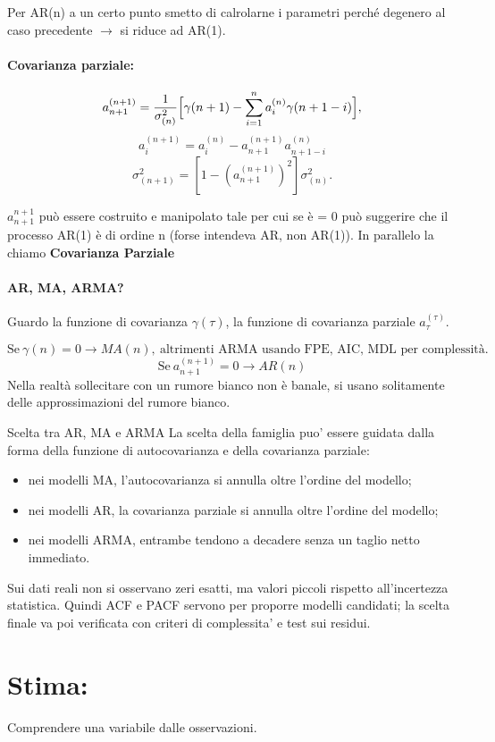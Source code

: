 \documentclass[11pt,a4paper]{article}
\begin{document}
Per AR(n) a un certo punto smetto di calrolarne i parametri perché degenero al caso precedente $\rightarrow$ si riduce ad AR(1). 

\paragraph{Covarianza parziale:}
\[
a_{n+1}^{(n+1)}=\frac{1}{\sigma^2_{(n)}}\Bigl[\gamma(n+1)-\sum_{i=1}^{n}a_i^{(n)}\gamma(n+1-i)\Bigr],
\]
\[
a_i^{(n+1)}=a_i^{(n)}-a_{n+1}^{(n+1)}a_{n+1-i}^{(n)}
\]
\[
\sigma^2_{(n+1)}=[1-(a_{n+1}^{(n+1)})^2]\sigma^2_{(n)}.
\]

$a_{n+1}^{n+1}$ può essere costruito e manipolato tale per cui se è = 0 può suggerire che il processo AR(1) è di ordine n (forse intendeva AR, non AR(1)). In parallelo la chiamo \textbf{Covarianza Parziale}

\paragraph{AR, MA, ARMA?} 
Guardo la funzione di covarianza $\gamma(\tau)$, la funzione di covarianza parziale $a_{\tau}^{(\tau)}$. 

\[
\text{Se} \ \gamma(n) = 0 \rightarrow MA(n), \ \text{altrimenti ARMA usando FPE, AIC, MDL per complessità.}
\]
\[
\text{Se}\  a_{n+1}^{(n+1)}= 0 \rightarrow AR(n)
\]
Nella realtà sollecitare con un rumore bianco non è banale, si usano solitamente delle approssimazioni del rumore bianco.

\begin{spiegazione}{Scelta tra AR, MA e ARMA}
La scelta della famiglia puo' essere guidata dalla forma della funzione di autocovarianza e della covarianza parziale:
\begin{itemize}
  \item nei modelli MA, l'autocovarianza si annulla oltre l'ordine del modello;
  \item nei modelli AR, la covarianza parziale si annulla oltre l'ordine del modello;
  \item nei modelli ARMA, entrambe tendono a decadere senza un taglio netto immediato.
\end{itemize}
Sui dati reali non si osservano zeri esatti, ma valori piccoli rispetto all'incertezza statistica. Quindi ACF e PACF servono per proporre modelli candidati; la scelta finale va poi verificata con criteri di complessita' e test sui residui.
\end{spiegazione}
\section{Stima:}
Comprendere una variabile dalle osservazioni.
\end{document}
